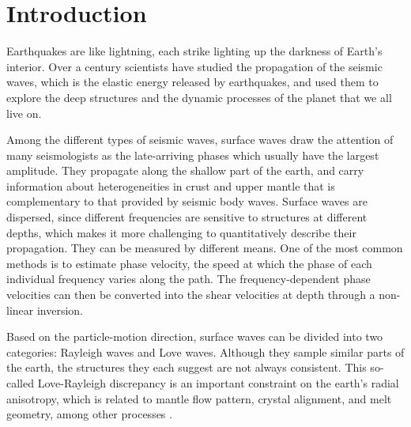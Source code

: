 \documentclass[12pt,oneside]{book}
\begin{document}


\mainmatter


\singlespacing
\chapter{Introduction}
\label{ch:intro}
\doublespacing

\pagestyle{fancy}
\chead{}
\cfoot{\thepage}
\renewcommand{\headrulewidth}{0pt} %
\thispagestyle{fancy}

Earthquakes are like lightning, each strike lighting up the darkness of Earth's interior. Over a century scientists have studied the propagation of the seismic waves, which is the elastic energy released by earthquakes, and used them to explore the deep structures and the dynamic processes of the planet that we all live on. 

Among the different types of seismic waves, surface waves draw the attention of many seismologists as the late-arriving phases which usually have the largest amplitude. They propagate along the shallow part of the earth, and carry information about heterogeneities in crust and upper mantle  that is complementary to that provided by seismic body waves.
Surface waves are dispersed, since different frequencies are sensitive to  structures at different depths, which makes it more challenging to quantitatively describe their propagation. 
They can be measured by different means. One of the most common methods is to estimate phase velocity, the speed at which the phase of each individual frequency varies along the path. 
The frequency-dependent phase velocities can then be converted into the shear velocities at depth through a non-linear inversion.

Based on the particle-motion direction, surface waves can be divided into two categories: Rayleigh waves and Love waves. Although they sample similar parts of the earth, the structures they each suggest  are not always consistent. This so-called Love-Rayleigh discrepancy is an important constraint on the earth's radial anisotropy, which is related to mantle flow pattern, crystal alignment, and melt geometry, among other processes \citep[e.g.][]{Gaherty:2004is,Gaherty:2007cc,Holtzman:2010fta}.
\end{document}
